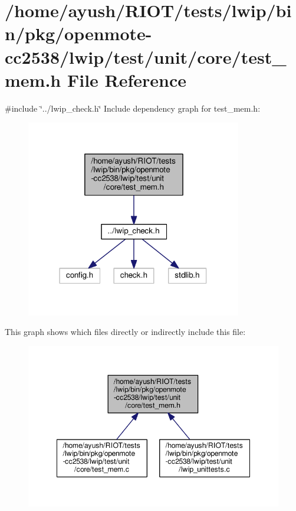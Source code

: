 \hypertarget{openmote-cc2538_2lwip_2test_2unit_2core_2test__mem_8h}{}\section{/home/ayush/\+R\+I\+O\+T/tests/lwip/bin/pkg/openmote-\/cc2538/lwip/test/unit/core/test\+\_\+mem.h File Reference}
\label{openmote-cc2538_2lwip_2test_2unit_2core_2test__mem_8h}
{\ttfamily \#include \char`\"{}../lwip\+\_\+check.\+h\char`\"{}}\newline
Include dependency graph for test\+\_\+mem.\+h\+:
\nopagebreak
\begin{figure}[H]
\begin{center}
\leavevmode
\includegraphics[width=267pt]{openmote-cc2538_2lwip_2test_2unit_2core_2test__mem_8h__incl}
\end{center}
\end{figure}
This graph shows which files directly or indirectly include this file\+:
\nopagebreak
\begin{figure}[H]
\begin{center}
\leavevmode
\includegraphics[width=348pt]{openmote-cc2538_2lwip_2test_2unit_2core_2test__mem_8h__dep__incl}
\end{center}
\end{figure}
